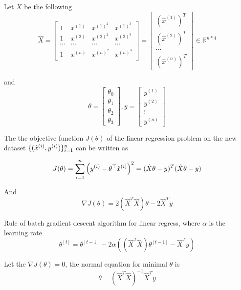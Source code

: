 \begin{answer}

Let $X$ be the following
\begin{equation*}
	\hat{X} = \left[\begin{matrix}
	    1 & x^{(1)} & x^{(1)}^2 & x^{(1)}^3 \\
            1 & x^{(2)} & x^{(2)}^2 & x^{(2)}^3 \\
            \cdots & \cdots & \cdots & \cdots \\
            1 & x^{(n)} & x^{(n)}^2 & x^{(n)}^3 \\
	\end{matrix} \right] = \left[\begin{matrix} (\hat{x}^{(1)})^T \\ (\hat{x}^{(2)})^T \\ 
 \cdots \\ (\hat{x}^{(n)})^T  \end{matrix} \right] \in  
 \mathbb{R}^{n*4}
\end{equation*}

and 
\begin{equation*}
	\theta = \left[\begin{array}{c} \theta_0\\ \theta_1 \\ \theta_2 \\ \theta_3 \end{array}\right],  y = \left[\begin{array}{c} y^{(1)} \\ y^{(2)}\\ \vdots \\ y^{(n)} \end{array}\right]
\end{equation*}

The the objective function $J(\theta)$ of the linear regression problem on the new dataset $\{(\hat{x}^{(i)}, y^{(i)})\}_{i=1}^{{n}}$ can be written as 

\begin{equation*}
	J(\theta) = \sum_{i=1}^{n} \left( y^{(i)} - \theta ^\top \hat{x}^{(i)}\right) ^ 2 = (\hat{X} \theta - y)^T(\hat{X} \theta - y)
\end{equation*}

And 
\begin{equation*}
    \nabla J(\theta) = 2(\hat{X}^T\hat{X})\theta - 2 \hat{X}^Ty 
\end{equation*}

Rule of batch gradient descent algorithm for linear regress, where $\alpha$ is the learning rate
\begin{equation*}
	\theta^{[t]} = \theta^{[t-1]} - 2\alpha \left((\hat{X}^T\hat{X})\theta^{[t-1]} -  \hat{X}^Ty\right)
\end{equation*}

Let the $\nabla J(\theta) = 0$, the normal equation for minimal $\theta$ is 
\begin{equation*}
	\theta = (\hat{X}^T\hat{X})^{-1} \hat{X}^Ty
\end{equation*}

\end{answer}
